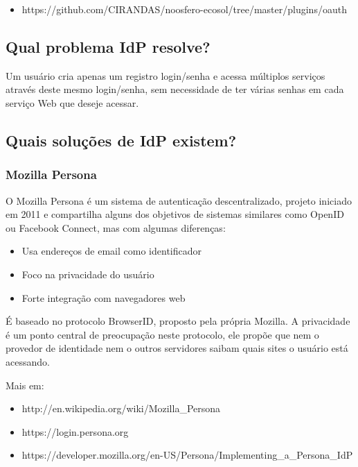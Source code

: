 \documentclass[11pt]{article}
\begin{document}
\begin{itemize}
  \item{https://github.com/CIRANDAS/noosfero-ecosol/tree/master/plugins/oauth}
\end{itemize}

\subsection{Qual problema IdP resolve?}

Um usuário cria apenas um registro login/senha e acessa múltiplos serviços
através deste mesmo login/senha, sem necessidade de ter várias senhas em cada
serviço Web que deseje acessar.

\subsection{Quais soluções de IdP existem?}

\subsubsection{Mozilla Persona}

O Mozilla Persona é um sistema de autenticação descentralizado, projeto
iniciado em 2011 e compartilha alguns dos objetivos de sistemas similares como
OpenID ou Facebook Connect, mas com algumas diferenças:

\begin{itemize}
  \item{Usa endereços de email como identificador}
  \item{Foco na privacidade do usuário}
  \item{Forte integração com navegadores web}
\end{itemize}

É baseado no protocolo BrowserID, proposto pela própria
Mozilla\cite{introBrowserID}.  A privacidade é um ponto central de preocupação
neste protocolo, ele propõe que nem o provedor de identidade nem o outros
servidores saibam quais sites o usuário está acessando.

Mais em:
\begin{itemize}
  \item{http://en.wikipedia.org/wiki/Mozilla\_Persona}
  \item{https://login.persona.org}
  \item{https://developer.mozilla.org/en-US/Persona/Implementing\_a\_Persona\_IdP}
\end{itemize}
\end{document}
